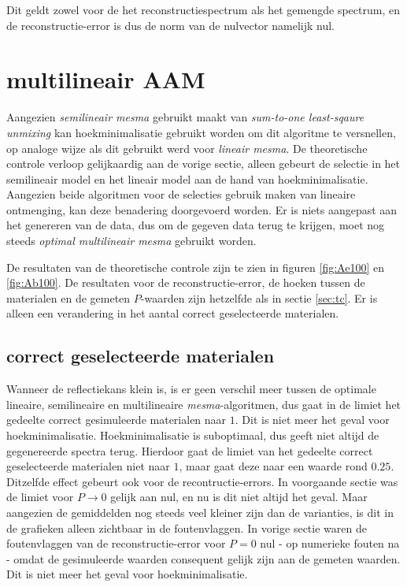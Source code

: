 \documentclass[12pt]{report}
\begin{document}
Dit geldt zowel voor de het reconstructiespectrum als het gemengde spectrum, en de reconstructie-error is dus de norm van de nulvector namelijk nul.
 

\section{multilineair AAM} \label{sec:MAAM}

Aangezien \textit{semilineair mesma} gebruikt maakt van \textit{sum-to-one least-sqaure unmixing} kan hoekminimalisatie gebruikt worden om dit algoritme te versnellen, op analoge wijze als dit gebruikt werd voor \textit{lineair mesma}. De theoretische controle verloop gelijkaardig aan de vorige sectie, alleen gebeurt de selectie in het semilineair model en het lineair model aan de hand van hoekminimalisatie. Aangezien beide algoritmen voor de selecties gebruik maken van lineaire ontmenging, kan deze benadering doorgevoerd worden. Er is niets aangepast aan het genereren van de data, dus om de gegeven data terug te krijgen, moet nog steeds \textit{optimal multilineair mesma} gebruikt worden.

De resultaten van de theoretische controle zijn te zien in figuren \ref{fig:Ae100} en \ref{fig:Ab100}. De resultaten voor de reconstructie-error, de hoeken tussen de materialen en de gemeten $P$-waarden zijn hetzelfde als in sectie \ref{sec:tc}. Er is alleen een verandering in het aantal correct geselecteerde materialen.

\subsection{correct geselecteerde materialen}
Wanneer de reflectiekans klein is, is er geen verschil meer tussen de optimale lineaire, semilineaire en multilineaire \textit{mesma}-algoritmen, dus gaat in de limiet het gedeelte correct gesimuleerde materialen naar $1$. Dit is niet meer het geval voor hoekminimalisatie. Hoekminimalisatie is suboptimaal, dus geeft niet altijd de gegenereerde spectra terug. Hierdoor gaat de limiet van het gedeelte correct geselecteerde materialen niet naar $1$, maar gaat deze naar een waarde rond $0.25$. Ditzelfde effect gebeurt ook voor de recontructie-errors. In voorgaande sectie was de limiet voor $P \rightarrow 0$ gelijk aan nul, en nu is dit niet altijd het geval. Maar aangezien de gemiddelden nog steeds veel kleiner zijn dan de varianties, is dit in de grafieken alleen zichtbaar in de foutenvlaggen. In vorige sectie waren de foutenvlaggen van de reconstructie-error voor $P=0$ nul - op numerieke fouten na - omdat de gesimuleerde waarden consequent gelijk zijn aan de gemeten waarden. Dit is niet meer het geval voor hoekminimalisatie. 
\end{document}

